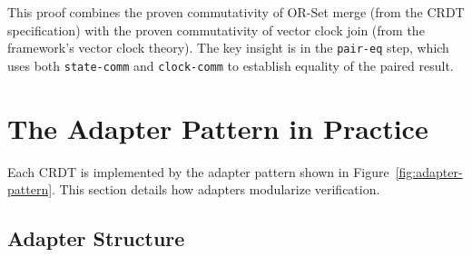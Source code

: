 This proof combines the proven commutativity of OR-Set merge (from the CRDT specification) with the proven commutativity of vector clock join (from the framework's vector clock theory). The key insight is in the \texttt{pair-eq} step, which uses both \texttt{state-comm} and \texttt{clock-comm} to establish equality of the paired result.


\section{The Adapter Pattern in Practice}

Each CRDT is implemented by the adapter pattern shown in Figure~\ref{fig:adapter-pattern}. This section details how adapters modularize verification.

\subsection{Adapter Structure}

